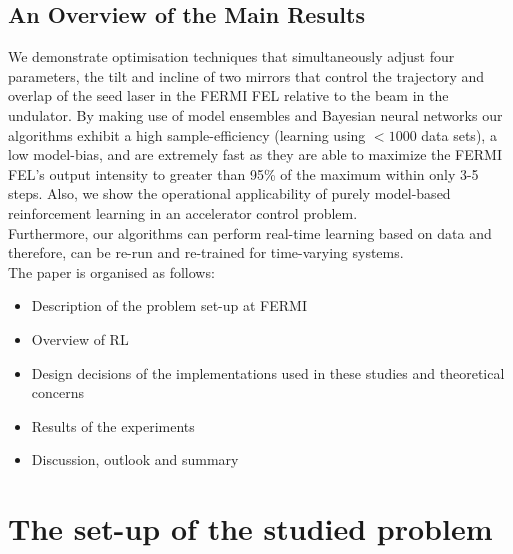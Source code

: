 \documentclass[
reprint,
amsmath,amssymb,amsfonts,clevref,
aps,
prstab,
]{revtex4-2}
\begin{document}
	\subsection{An Overview of the Main Results}
	We demonstrate optimisation techniques that simultaneously adjust four parameters, the tilt and incline of two mirrors that control the trajectory and overlap of the seed laser in the FERMI FEL relative to the beam in the undulator. 
	By making use of model ensembles and Bayesian neural networks our algorithms exhibit a high sample-efficiency (learning using $<1000$ data sets), a low model-bias, and are extremely fast as they are able to maximize the FERMI FEL's output intensity to greater than 95\% of the maximum within only 3-5 steps.
	 Also, we show the operational applicability of purely model-based reinforcement learning in an accelerator control problem.\\
	Furthermore, our algorithms can perform real-time learning based on data and therefore, can be re-run and re-trained for time-varying systems.\\
	The paper is organised as follows:
	\begin{itemize}
		\item Description of the problem set-up at FERMI
		\item Overview of RL
		\item Design decisions of the implementations used in these studies and theoretical concerns
		\item Results of the experiments 
		\item Discussion, outlook and summary
	\end{itemize}
	
	
	\section{The set-up of the studied problem}
\end{document}
